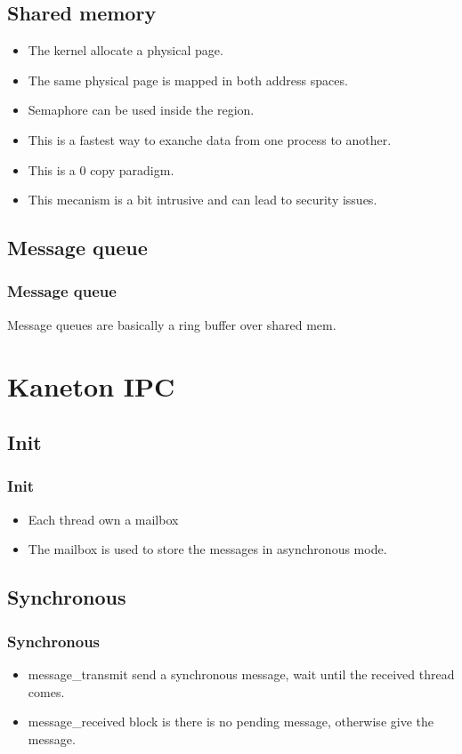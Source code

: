 \subsection{Shared memory}
\begin{frame}
\begin{itemize}
\item The kernel allocate a physical page.
\item The same physical page is mapped in both address spaces.
\item Semaphore can be used inside the region.
\item This is a fastest way to exanche data from one process to another.
\item This is a 0 copy paradigm.
\item This mecanism is a bit intrusive and can lead to security issues.
\end{itemize}
\end{frame}

\subsection{Message queue}
\begin{frame}
\frametitle{Message queue}
Message queues are basically a ring buffer over shared mem.
\end{frame}


\section{Kaneton IPC}
\subsection{Init}
\begin{frame}
\frametitle{Init}
\begin{itemize}
\item Each thread own a mailbox
\item The mailbox is used to store the messages in asynchronous mode.
\end{itemize}
\end{frame}

\subsection{Synchronous}
\begin{frame}
\frametitle{Synchronous}
\begin{itemize}
\item message\_transmit send a synchronous message, wait until the
received thread comes.
\item message\_received block is there is no pending message, otherwise
give the message.
\end{itemize}
\end{frame}

